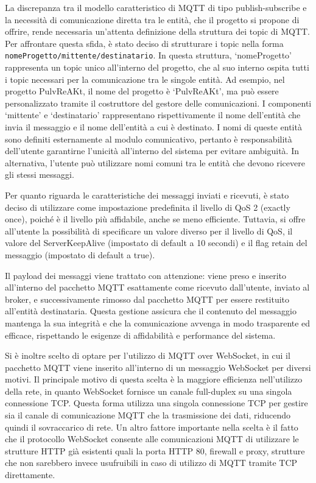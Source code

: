 \documentclass[12pt,a4paper,openright,twoside]{book}
\begin{document}
La discrepanza tra il modello caratteristico di \ac{MQTT} di tipo publish-subscribe e la necessità di comunicazione diretta tra le entità, 
che il progetto si propone di offrire, rende necessaria un'attenta definizione della struttura dei topic di \ac{MQTT}. Per affrontare questa sfida, 
è stato deciso di strutturare i topic nella forma \texttt{nomeProgetto/mittente/destinatario}. In questa struttura, `nomeProgetto' rappresenta un topic 
unico all'interno del progetto, che al suo interno ospita tutti i topic necessari per la comunicazione tra le singole entità. Ad esempio, nel progetto PulvReAKt, 
il nome del progetto è `PulvReAKt', ma può essere personalizzato tramite il costruttore del gestore delle comunicazioni.
I componenti `mittente' e `destinatario' rappresentano rispettivamente il nome dell'entità che invia il messaggio e il nome dell'entità a cui è destinato. 
I nomi di queste entità sono definiti esternamente al modulo comunicativo, pertanto è responsabilità dell'utente garantirne l'unicità all'interno del sistema 
per evitare ambiguità. In alternativa, l'utente può utilizzare nomi comuni tra le entità che devono ricevere gli stessi messaggi.

Per quanto riguarda le caratteristiche dei messaggi inviati e ricevuti, è stato deciso di utilizzare come impostazione predefinita il livello di \ac{QoS} 2 (exactly once), 
poiché è il livello più affidabile, anche se meno efficiente. Tuttavia, si offre all'utente la possibilità di specificare un valore diverso per il livello di \ac{QoS}, 
il valore del ServerKeepAlive (impostato di default a 10 secondi) e il flag retain del messaggio (impostato di default a true). 

Il payload dei messaggi viene trattato con attenzione: viene preso e inserito all'interno del pacchetto \ac{MQTT} esattamente come ricevuto dall'utente, inviato al broker, 
e successivamente rimosso dal pacchetto \ac{MQTT} per essere restituito all'entità destinataria. Questa gestione assicura che il contenuto del messaggio mantenga la sua 
integrità e che la comunicazione avvenga in modo trasparente ed efficace, rispettando le esigenze di affidabilità e performance del sistema.

Si è inoltre scelto di optare per l'utilizzo di \ac{MQTT} over WebSocket, in cui il pacchetto \ac{MQTT} viene inserito all'interno di un messaggio WebSocket per diversi motivi.
Il principale motivo di questa scelta è la maggiore efficienza nell'utilizzo della rete, in quanto WebSocket fornisce un canale full-duplex su una singola connessione \ac{TCP}.
Questa forma utilizza una singola connessione TCP per gestire sia il canale di comunicazione MQTT che la trasmissione dei dati, riducendo quindi il sovraccarico di rete.
Un altro fattore importante nella scelta è il fatto che il protocollo WebSocket consente alle comunicazioni \ac{MQTT} di utilizzare le strutture HTTP già esistenti 
quali la porta HTTP 80, firewall e proxy, strutture che non sarebbero invece usufruibili in caso di utilizzo di \ac{MQTT} tramite \ac{TCP} direttamente.
\end{document}
